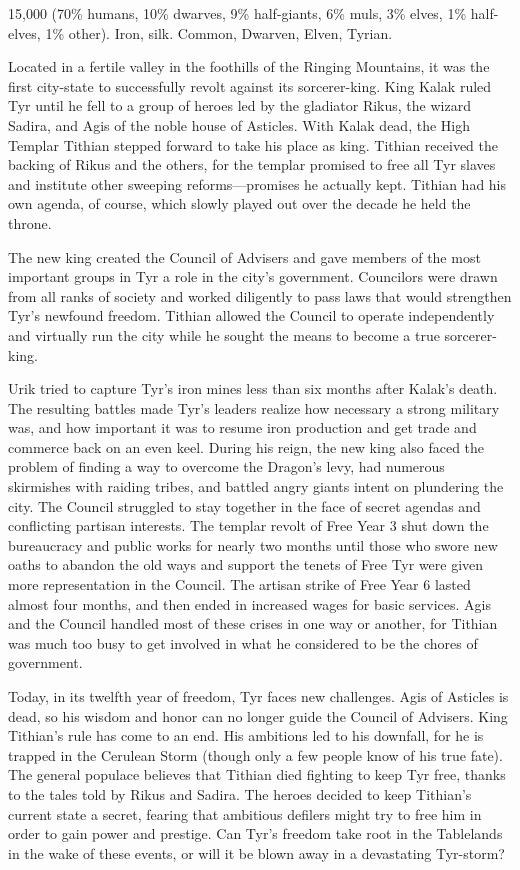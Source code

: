 {15,000 (70\% humans, 10\% dwarves, 9\% half-giants, 6\% muls, 3\% elves, 1\% half-elves, 1\% other).}
{Iron, silk.}
{Common, Dwarven, Elven, Tyrian.}
{
	Located in a fertile valley in the foothills of the Ringing Mountains, it was the first city-state to successfully revolt against its sorcerer-king. King Kalak ruled Tyr until he fell to a group of heroes led by the gladiator Rikus, the wizard Sadira, and Agis of the noble house of Asticles. With Kalak dead, the High Templar Tithian stepped forward to take his place as king. Tithian received the backing of Rikus and the others, for the templar promised to free all Tyr slaves and institute other sweeping reforms---promises he actually kept. Tithian had his own agenda, of course, which slowly played out over the decade he held the throne.

	The new king created the Council of Advisers and gave members of the most important groups in Tyr a role in the city's government. Councilors were drawn from all ranks of society and worked diligently to pass laws that would strengthen Tyr's newfound freedom. Tithian allowed the Council to operate independently and virtually run the city while he sought the means to become a true sorcerer-king.

	Urik tried to capture Tyr's iron mines less than six months after Kalak's death. The resulting battles made Tyr's leaders realize how necessary a strong military was, and how important it was to resume iron production and get trade and commerce back on an even keel. During his reign, the new king also faced the problem of finding a way to overcome the Dragon's levy, had numerous skirmishes with raiding tribes, and battled angry giants intent on plundering the city. The Council struggled to stay together in the face of secret agendas and conflicting partisan interests. The templar revolt of Free Year 3 shut down the bureaucracy and public works for nearly two months until those who swore new oaths to abandon the old ways and support the tenets of Free Tyr were given more representation in the Council. The artisan strike of Free Year 6 lasted almost four months, and then ended in increased wages for basic services. Agis and the Council handled most of these crises in one way or another, for Tithian was much too busy to get involved in what he considered to be the chores of government.

	Today, in its twelfth year of freedom, Tyr faces new challenges. Agis of Asticles is dead, so his wisdom and honor can no longer guide the Council of Advisers. King Tithian's rule has come to an end. His ambitions led to his downfall, for he is trapped in the Cerulean Storm (though only a few people know of his true fate). The general populace believes that Tithian died fighting to keep Tyr free, thanks to the tales told by Rikus and Sadira. The heroes decided to keep Tithian's current state a secret, fearing that ambitious defilers might try to free him in order to gain power and prestige. Can Tyr's freedom take root in the Tablelands in the wake of these events, or will it be blown away in a devastating Tyr-storm?

}
